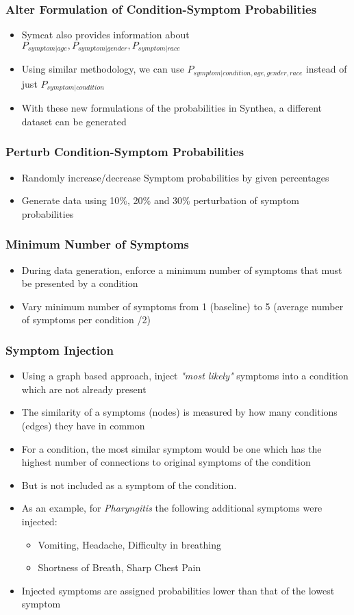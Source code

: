 \documentclass{beamer}
\begin{document}
\begin{frame}
\frametitle{Alter Formulation of Condition-Symptom Probabilities}
\begin{itemize}
	\item Symcat also provides information about $P_{symptom|age}, P_{symptom|gender}, P_{symptom|race}$
	\item Using similar methodology, we can use $P_{symptom|condition, age, gender, race}$ instead of just $P_{symptom|condition}$
	\item With these new formulations of the probabilities in Synthea, a different dataset can be generated
\end{itemize}
\end{frame}


\begin{frame}
\frametitle{Perturb Condition-Symptom Probabilities}
\begin{itemize}
	\item Randomly increase/decrease Symptom probabilities by given percentages
	\item Generate data using 10\%, 20\% and 30\% perturbation of symptom probabilities
\end{itemize}
\end{frame}


\begin{frame}
\frametitle{Minimum Number of Symptoms}
\begin{itemize}
	\item During data generation, enforce a minimum number of symptoms that must be presented by a condition
	\item Vary minimum number of symptoms from 1 (baseline) to 5 (average number of symptoms per condition /2)
\end{itemize}
\end{frame}


\begin{frame}
\frametitle{Symptom Injection}
\begin{itemize}
	\item Using a graph based approach, inject \textit{"most likely"} symptoms into a condition which are not already present
	\item The similarity of a symptoms (nodes) is measured by how many conditions (edges) they have in common
	\item For a condition, the most similar symptom would be one which has the highest number of connections to original symptoms of the condition
	\item But is not included as a symptom of the condition.
	\item As an example, for \textit{Pharyngitis} the following additional symptoms were injected: 
	\begin{itemize}
		\item Vomiting, Headache, Difficulty in breathing
		\item Shortness of Breath, Sharp Chest Pain
	\end{itemize}
	\item Injected symptoms are assigned probabilities lower than that of the lowest symptom
\end{itemize}
\end{frame}
\end{document}
